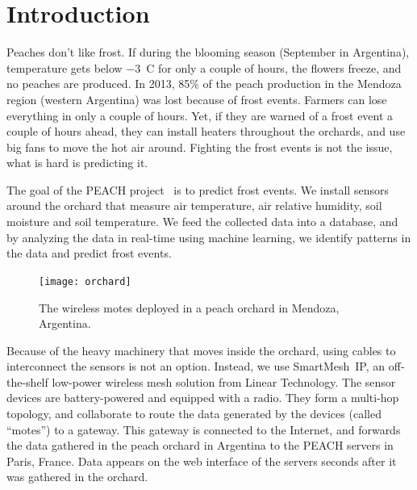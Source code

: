 \documentclass{sig-alternate}
\newcommand{\smip}                {SmartMesh~IP\xspace}
\begin{document}
\section{Introduction}
\label{sec:intro}


Peaches don't like frost.
If during the blooming season (September in Argentina), temperature gets below $-$3~C for only a couple of hours, the flowers freeze, and no peaches are produced.
In 2013, 85\% of the peach production in the Mendoza region (western Argentina) was lost because of frost events.
Farmers can lose everything in only a couple of hours.
Yet, if they are warned of a frost event a couple of hours ahead, they can install heaters throughout the orchards, and use big fans to move the hot air around.
Fighting the frost events is not the issue, what is hard is predicting it.


The goal of the PEACH project~\cite{watteyne16peach} is to predict frost events.
We install sensors around the orchard that measure air temperature, air relative humidity, soil moisture and soil temperature.
We feed the collected data into a database, and by analyzing the data in real-time using machine learning, we identify patterns in the data and predict frost events.

\begin{figure}
    \centering
    \texttt{[image: orchard]}
    \caption{The wireless motes deployed in a peach orchard in Mendoza, Argentina.}
    \label{fig:orchard}
\end{figure}


Because of the heavy machinery that moves inside the orchard, using cables to interconnect the sensors is not an option.
Instead, we use \smip, an off-the-shelf low-power wireless mesh solution from Linear Technology.
The sensor devices are battery-powered and equipped with a radio.
They form a multi-hop topology, and collaborate to route the data generated by the devices (called ``motes'') to a gateway.
This gateway is connected to the Internet, and forwards the data gathered in the peach orchard in Argentina to the PEACH servers in Paris, France.
Data appears on the web interface of the servers seconds after it was gathered in the orchard.
\end{document}
